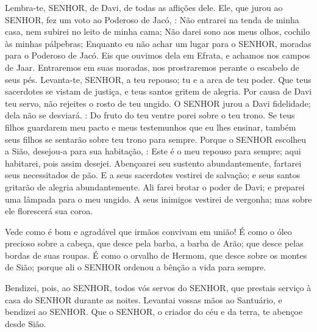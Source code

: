 {\PP 
  Lembra-te, SENHOR, de Davi,
{} de todas as aflições dele.
  Ele, que jurou ao SENHOR,
{} fez um voto ao Poderoso de Jacó,
   : Não entrarei na tenda de minha casa, nem subirei no leito de minha cama;
  Não darei sono aos meus olhos,
{} cochilo às minhas pálpebras;
  Enquanto eu não achar um lugar para o SENHOR, moradas para o Poderoso de Jacó.
  Eis que ouvimos dela em Efrata, e
{} achamos nos campos de Jaar.
  Entraremos em suas moradas,
{} nos prostraremos perante o escabelo de seus pés.
  Levanta-te, SENHOR, a teu repouso; tu e a arca de teu poder.
  Que teus sacerdotes se vistam de justiça, e teus santos gritem de alegria.
  Por causa de Davi teu servo, não rejeites o rosto de teu ungido.
  O SENHOR jurou a Davi
{} fidelidade; dela não se desviará.
{} : Do fruto do teu ventre porei sobre o teu trono.
  Se teus filhos guardarem meu pacto e meus testemunhos que eu lhes ensinar, também seus filhos se sentarão sobre teu trono para sempre.
  Porque o SENHOR escolheu a Sião, desejou-a para sua habitação,
   : Este é o meu repouso para sempre; aqui habitarei, pois assim desejei.
  Abençoarei seu sustento abundantemente,
{} fartarei seus necessitados de pão.
  E a seus sacerdotes vestirei de salvação; e seus santos gritarão de alegria abundantemente.
  Ali farei brotar o poder de Davi; e preparei uma lâmpada para o meu ungido.
  A seus inimigos vestirei de vergonha; mas sobre ele florescerá sua coroa.
\par }


{\PP 
  Vede como é bom e agradável que irmãos convivam em união!
  É como o óleo precioso sobre a cabeça, que desce pela barba, a barba de Arão; que desce pelas bordas de suas roupas.
  É como o orvalho de Hermom, que desce sobre os montes de Sião; porque ali o SENHOR ordenou a bênção
{} a vida para sempre.
\par }


{\PP 
  Bendizei, pois, ao SENHOR, todos vós servos do SENHOR, que prestais serviço à casa do SENHOR durante as noites.
  Levantai vossas mãos ao Santuário, e bendizei ao SENHOR.
  Que o SENHOR, o criador do céu e da terra, te abençoe desde Sião.
\par }

